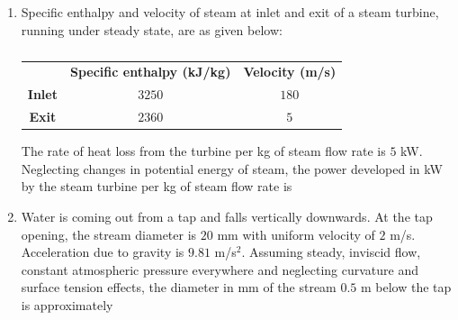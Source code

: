 \documentclass[journal]{IEEEtran}
\begin{document}
\begin{enumerate}[leftmargin=0pt]
\item Specific enthalpy and velocity of steam at inlet and exit of a steam turbine, running under steady state, are as given below:

\begin{table}[h!]
\centering
\caption*{}
\label{tab:q28}
\begin{tabular}{c c c}
 & \textbf{Specific enthalpy (kJ/kg)} & \textbf{Velocity (m/s)} \\
\textbf{Inlet} & $3250$ & $180$ \\
\textbf{Exit} & $2360$ & $5$ \\
\end{tabular}
\end{table}

The rate of heat loss from the turbine per kg of steam flow rate is $5$ kW. Neglecting changes in potential energy of steam, the power developed in kW by the steam turbine per kg of steam flow rate is
\begin{enumerate}
\end{enumerate}
\hfill{}

\item Water is coming out from a tap and falls vertically downwards. At the tap opening, the stream diameter is $20$ mm with uniform velocity of $2$ m/s. Acceleration due to gravity is $9.81$ m/s$^2$. Assuming steady, inviscid flow, constant atmospheric pressure everywhere and neglecting curvature and surface tension effects, the diameter in mm of the stream $0.5$ m below the tap is approximately
\begin{enumerate}
\end{enumerate}
\hfill{}


\end{enumerate}
\end{document}
